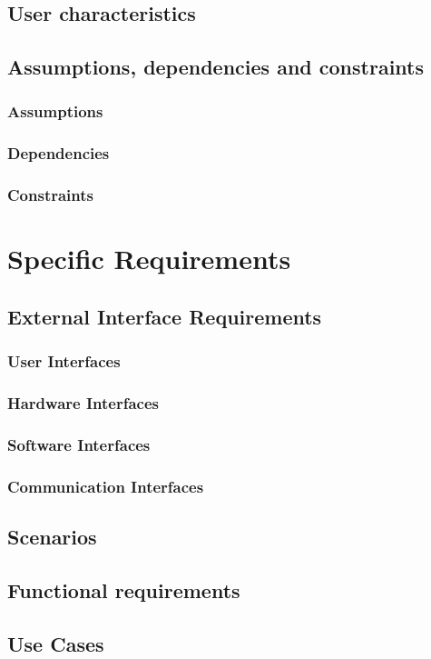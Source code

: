 \documentclass{article}
\begin{document}
\subsection{User characteristics}
\subsection{Assumptions, dependencies and constraints}
\subsubsection{Assumptions}
\subsubsection{Dependencies}
\subsubsection{Constraints}

\newpage
\section{Specific Requirements}
\subsection{External Interface Requirements}
\subsubsection{User Interfaces}
\subsubsection{Hardware Interfaces}
\subsubsection{Software Interfaces}
\subsubsection{Communication Interfaces}
\subsection{Scenarios}
\subsection{Functional requirements}
\subsection{Use Cases}
\end{document}
